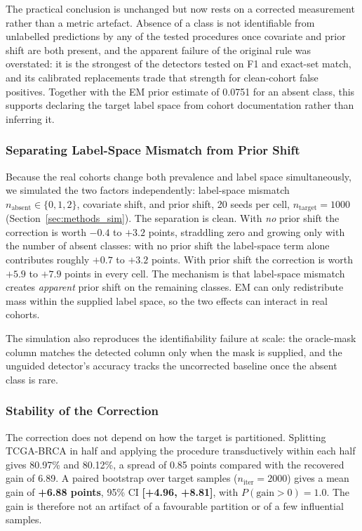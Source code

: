 \documentclass[11pt,a4paper]{article}
\begin{document}
The practical conclusion is unchanged but now rests on a corrected measurement rather than a
metric artefact. Absence of a class is not identifiable from unlabelled predictions by any of the
tested procedures once covariate and prior shift are both present, and the apparent failure of the
original rule was overstated: it is the strongest of the detectors tested on F1 and exact-set
match, and its calibrated replacements trade that strength for clean-cohort false positives. Together with the
EM prior estimate of 0.0751 for an absent class, this supports declaring the target label space
from cohort documentation rather than inferring it.

\subsubsection{Separating Label-Space Mismatch from Prior Shift}

Because the real cohorts change both prevalence and label space simultaneously, we simulated the
two factors independently: label-space mismatch $n_{\text{absent}} \in \{0,1,2\}$, covariate
shift, and prior shift, 20 seeds per cell, $n_{\text{target}} = 1000$
(Section~\ref{sec:methods_sim}). The separation is clean. With \emph{no} prior shift the
correction is worth $-0.4$ to $+3.2$ points, straddling zero and growing only with the number of
absent classes: with no prior shift the label-space term alone contributes roughly $+0.7$ to
$+3.2$ points. With prior shift the correction is worth $+5.9$ to $+7.9$ points in every cell.
The mechanism is that label-space mismatch creates \emph{apparent} prior shift on the remaining
classes. EM can only redistribute mass within the supplied label space, so the two effects can
interact in real cohorts.

The simulation also reproduces the identifiability failure at scale: the oracle-mask column
matches the detected column only when the mask is supplied, and the unguided detector's accuracy
tracks the uncorrected baseline once the absent class is rare.

\subsubsection{Stability of the Correction}

The correction does not depend on how the target is partitioned. Splitting TCGA-BRCA in half and
applying the procedure transductively within each half gives 80.97\% and 80.12\%, a spread of
0.85 points compared with the recovered gain of 6.89. A paired bootstrap over target samples
($n_{\text{iter}} = 2000$) gives a mean gain of \textbf{+6.88 points}, 95\% CI
\textbf{[+4.96, +8.81]}, with $P(\text{gain} > 0) = 1.0$. The gain is therefore not an artifact
of a favourable partition or of a few influential samples.
\end{document}
